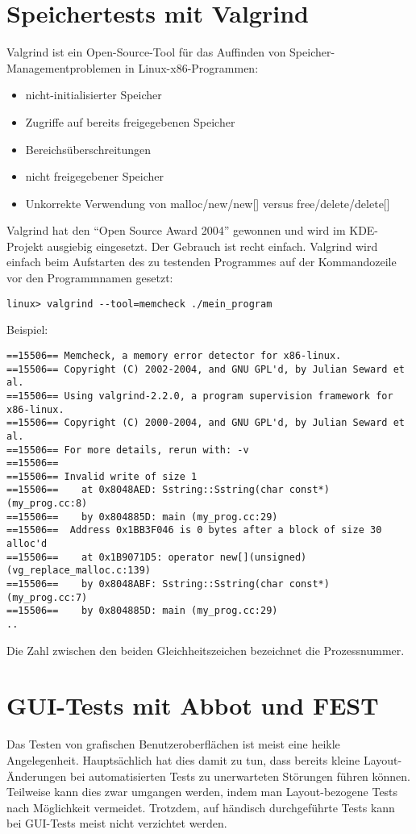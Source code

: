\section{Speichertests mit Valgrind}
Valgrind ist ein Open-Source-Tool für das Auffinden von
Speicher-Managementproblemen in Linux-x86-Programmen:
\begin{itemize}
\item nicht-initialisierter Speicher
\item Zugriffe auf bereits freigegebenen Speicher
\item Bereichsüberschreitungen
\item nicht freigegebener Speicher
\item Unkorrekte Verwendung von malloc/new/new[] versus free/delete/delete[]
\end{itemize}
Valgrind hat den ``Open Source Award 2004'' gewonnen und wird im
KDE-Projekt ausgiebig eingesetzt. Der Gebrauch ist recht einfach. Valgrind
wird einfach beim Aufstarten des  zu testenden Programmes auf der
Kommandozeile vor den Programmnamen gesetzt:
\begin{verbatim}
linux> valgrind --tool=memcheck ./mein_program
\end{verbatim}
Beispiel:
{
\ifslides\footnotesize
\else\small
\fi
\begin{verbatim}
==15506== Memcheck, a memory error detector for x86-linux.
==15506== Copyright (C) 2002-2004, and GNU GPL'd, by Julian Seward et al.
==15506== Using valgrind-2.2.0, a program supervision framework for x86-linux.
==15506== Copyright (C) 2000-2004, and GNU GPL'd, by Julian Seward et al.
==15506== For more details, rerun with: -v
==15506==
==15506== Invalid write of size 1
==15506==    at 0x8048AED: Sstring::Sstring(char const*) (my_prog.cc:8)
==15506==    by 0x804885D: main (my_prog.cc:29)
==15506==  Address 0x1BB3F046 is 0 bytes after a block of size 30 alloc'd
==15506==    at 0x1B9071D5: operator new[](unsigned) (vg_replace_malloc.c:139)
==15506==    by 0x8048ABF: Sstring::Sstring(char const*) (my_prog.cc:7)
==15506==    by 0x804885D: main (my_prog.cc:29)
..
\end{verbatim}
}
\ifslides
\else
Die Zahl zwischen den beiden Gleichheitszeichen bezeichnet die Prozessnummer.
\fi
%
\newpage
\section{GUI-Tests mit Abbot und FEST}
Das Testen von grafischen Benutzeroberflächen
ist meist eine heikle Angelegenheit. Hauptsächlich hat dies
damit zu tun, dass bereits kleine Layout-Änderungen bei
automatisierten Tests zu unerwarteten Störungen führen können.
Teilweise kann dies zwar umgangen werden,
indem man Layout-bezogene Tests nach Möglichkeit vermeidet. Trotzdem, auf
händisch durchgeführte Tests kann bei GUI-Tests meist nicht verzichtet werden.

